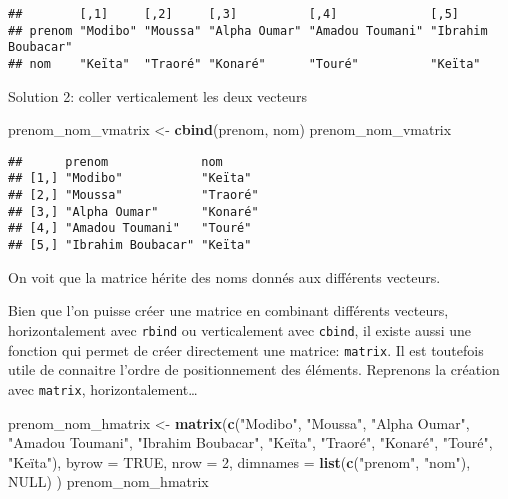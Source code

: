 \documentclass[]{book}
\newenvironment{Shaded}{\begin{snugshade}}{\end{snugshade}}
\newcommand{\KeywordTok}[1]{\textcolor[rgb]{0.13,0.29,0.53}{\textbf{#1}}}
\newcommand{\DataTypeTok}[1]{\textcolor[rgb]{0.13,0.29,0.53}{#1}}
\newcommand{\DecValTok}[1]{\textcolor[rgb]{0.00,0.00,0.81}{#1}}
\newcommand{\StringTok}[1]{\textcolor[rgb]{0.31,0.60,0.02}{#1}}
\newcommand{\OtherTok}[1]{\textcolor[rgb]{0.56,0.35,0.01}{#1}}
\newcommand{\NormalTok}[1]{#1}
\begin{document}
\begin{verbatim}
##        [,1]     [,2]     [,3]          [,4]             [,5]              
## prenom "Modibo" "Moussa" "Alpha Oumar" "Amadou Toumani" "Ibrahim Boubacar"
## nom    "Keïta"  "Traoré" "Konaré"      "Touré"          "Keïta"
\end{verbatim}

Solution 2: coller verticalement les deux vecteurs

\begin{Shaded}
\begin{Highlighting}[]
\NormalTok{prenom_nom_vmatrix <-}\StringTok{ }\KeywordTok{cbind}\NormalTok{(prenom, nom)}
\NormalTok{prenom_nom_vmatrix}
\end{Highlighting}
\end{Shaded}

\begin{verbatim}
##      prenom             nom     
## [1,] "Modibo"           "Keïta" 
## [2,] "Moussa"           "Traoré"
## [3,] "Alpha Oumar"      "Konaré"
## [4,] "Amadou Toumani"   "Touré" 
## [5,] "Ibrahim Boubacar" "Keïta"
\end{verbatim}

On voit que la matrice hérite des noms donnés aux différents vecteurs.

Bien que l'on puisse créer une matrice en combinant différents vecteurs,
horizontalement avec \texttt{rbind} ou verticalement avec
\texttt{cbind}, il existe aussi une fonction qui permet de créer
directement une matrice: \texttt{matrix}. Il est toutefois utile de
connaitre l'ordre de positionnement des éléments. Reprenons la création
avec \texttt{matrix}, horizontalement\ldots{} \tiny

\begin{Shaded}
\begin{Highlighting}[]
\NormalTok{prenom_nom_hmatrix <-}\StringTok{ }\KeywordTok{matrix}\NormalTok{(}\KeywordTok{c}\NormalTok{(}\StringTok{"Modibo"}\NormalTok{, }\StringTok{"Moussa"}\NormalTok{, }\StringTok{"Alpha Oumar"}\NormalTok{, }\StringTok{"Amadou Toumani"}\NormalTok{, }\StringTok{"Ibrahim Boubacar"}\NormalTok{,}
                             \StringTok{"Keïta"}\NormalTok{,  }\StringTok{"Traoré"}\NormalTok{, }\StringTok{"Konaré"}\NormalTok{, }\StringTok{"Touré"}\NormalTok{, }\StringTok{"Keïta"}\NormalTok{),}
                             \DataTypeTok{byrow =} \OtherTok{TRUE}\NormalTok{,}
                             \DataTypeTok{nrow =} \DecValTok{2}\NormalTok{,}
                             \DataTypeTok{dimnames =} \KeywordTok{list}\NormalTok{(}\KeywordTok{c}\NormalTok{(}\StringTok{"prenom"}\NormalTok{, }\StringTok{"nom"}\NormalTok{), }\OtherTok{NULL}\NormalTok{)}
\NormalTok{                             )}
\NormalTok{prenom_nom_hmatrix}
\end{Highlighting}
\end{Shaded}
\end{document}
